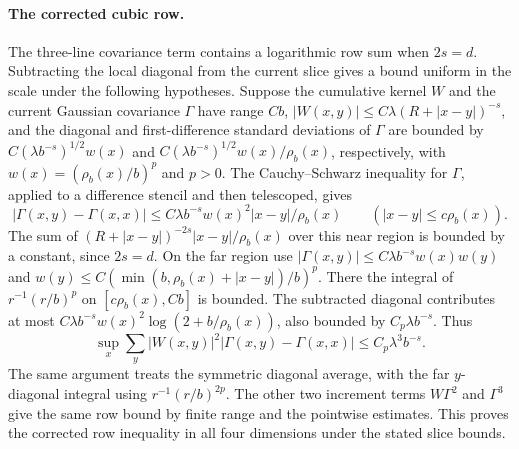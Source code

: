 \documentclass[11pt]{article}
\theoremstyle{definition}
\begin{document}
\paragraph{The corrected cubic row.}
The three-line covariance term contains a logarithmic row sum
when \(2s=d\). Subtracting the local diagonal from the current
slice gives a bound uniform in the scale under the following
hypotheses. Suppose the cumulative kernel \(W\)
and the current Gaussian covariance \(\Gamma\) have range
\(Cb\), \(|W(x,y)|\le C\lambda(R+|x-y|)^{-s}\), and the
diagonal and first-difference standard deviations of \(\Gamma\)
are bounded by \(C(\lambda b^{-s})^{1/2}w(x)\) and
\(C(\lambda b^{-s})^{1/2}w(x)/\rho_b(x)\), respectively,
with \(w(x)=(\rho_b(x)/b)^p\) and \(p>0\).
The Cauchy--Schwarz inequality for \(\Gamma\), applied to a
difference stencil and then telescoped, gives
\begin{equation}
 |\Gamma(x,y)-\Gamma(x,x)|
 \le C\lambda b^{-s}w(x)^2 |x-y|/\rho_b(x)
 \qquad (|x-y|\le c\rho_b(x)).
\end{equation}
The sum of \((R+|x-y|)^{-2s}|x-y|/\rho_b(x)\)
over this near region is bounded by a constant, since \(2s=d\).
On the far region use
\(|\Gamma(x,y)|\le C\lambda b^{-s}w(x)w(y)\) and
\(w(y)\le C(\min(b,\rho_b(x)+|x-y|)/b)^p\).
There the integral of \(r^{-1}(r/b)^p\) on \([c\rho_b(x),Cb]\)
is bounded. The subtracted diagonal contributes at most
\(C\lambda b^{-s}w(x)^2\log(2+b/\rho_b(x))\), also bounded by
\(C_p\lambda b^{-s}\). Thus
\begin{equation}
 \sup_x\sum_y |W(x,y)|^2
          |\Gamma(x,y)-\Gamma(x,x)|
 \le C_p\lambda^3 b^{-s}.
\end{equation}
The same argument treats the symmetric diagonal average, with the
far \(y\)-diagonal integral using \(r^{-1}(r/b)^{2p}\).
The other two increment terms \(W\Gamma^2\) and \(\Gamma^3\)
give the same row bound by finite range and the pointwise estimates.
This proves the corrected row inequality in all four dimensions
under the stated slice bounds.
\end{document}
